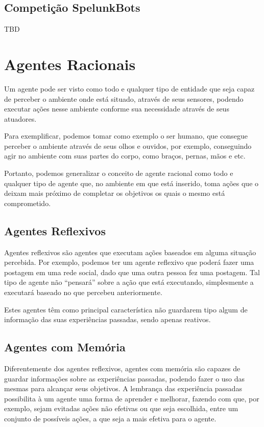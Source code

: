 \subsection{Competição SpelunkBots}

TBD

\section{Agentes Racionais}

Um agente pode ser visto como todo e qualquer tipo de entidade que seja capaz de
perceber o ambiente onde está situado, através de seus sensores, podendo
executar ações nesse ambiente conforme sua necessidade através de seus
atuadores.  \cite{Russell:1995:AIM:193191}

Para exemplificar, podemos tomar como exemplo o ser humano, que consegue
perceber o ambiente através de seus olhos e ouvidos, por exemplo, conseguindo
agir no ambiente com suas partes do corpo, como braços, pernas, mãos e etc.
\cite{Russell:1995:AIM:193191}

Portanto, podemos generalizar o conceito de agente racional como todo e qualquer
tipo de agente que, no ambiente em que está inserido, toma ações que o deixam
mais próximo de completar os objetivos os quais o mesmo está comprometido.

\subsection{Agentes Reflexivos}

Agentes reflexivos são agentes que executam ações baseados em alguma situação
percebida. Por exemplo, podemos ter um agente reflexivo que poderá fazer uma
postagem em uma rede social, dado que uma outra pessoa fez uma postagem. Tal
tipo de agente não ``pensará'' sobre a ação que está executando, simplesmente a
executará baseado no que percebeu anteriormente.

Estes agentes têm como principal característica não guardarem tipo algum de
informação das suas experiências passadas, sendo apenas reativos.

\subsection{Agentes com Memória}

Diferentemente dos agentes reflexivos, agentes com memória são capazes de
guardar informações sobre as experiências passadas, podendo fazer o uso das
mesmas para alcançar seus objetivos. A lembrança das experiência passadas
possibilita à um agente uma forma de aprender e melhorar, fazendo com que, por
exemplo, sejam evitadas ações não efetivas ou que seja escolhida, entre um
conjunto de possíveis ações, a que seja a mais efetiva para o agente.

